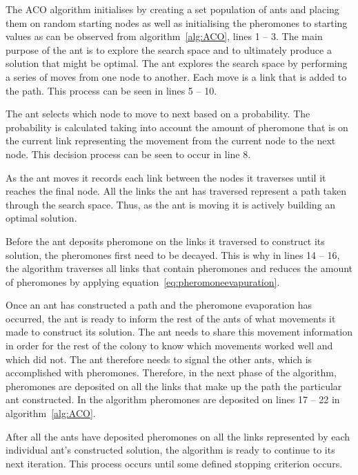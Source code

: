The \gls{ACO} algorithm initialises by creating a set population of ants and placing them on random starting nodes as well as initialising the pheromones to starting values as can be observed from algorithm~\ref{alg:ACO}, lines 1 -- 3. The main purpose of the ant is to explore the search space and to ultimately produce a solution that might be optimal. The ant explores the search space by performing a series of moves from one node to another. Each move is a link that is added to the path. This process can be seen in lines 5 -- 10.

The ant selects which node to move to next based on a probability. The probability is calculated taking into account the amount of pheromone that is on the current link representing the movement from the current node to the next node\cite{CompuIntelligenceIntro,FundamentalSwarm}. This decision process can be seen to occur in line 8.

As the ant moves it records each link between the nodes it traverses until it reaches the final node. All the links the ant has traversed represent a path taken through the search space\cite{CompuIntelligenceIntro,FundamentalSwarm}. Thus, as the ant is moving it is actively building an optimal solution.

Before the ant deposits pheromone on the links it traversed to construct its solution, the pheromones first need to be decayed. This is why in lines 14 -- 16, the algorithm traverses all links that contain pheromones and reduces the amount of pheromones by applying equation~\ref{eq:pheromoneevapuration}.

Once an ant has constructed a path and the pheromone evaporation has occurred, the ant is ready to inform the rest of the ants of what movements it made to construct its solution. The ant needs to share this movement information in order for the rest of the colony to know which movements worked well and which did not. The ant therefore needs to signal the other ants, which is accomplished with pheromones. Therefore, in the next phase of the algorithm, pheromones are deposited on all the links that make up the path the particular ant constructed. In the algorithm pheromones are deposited on lines 17 -- 22 in algorithm~\ref{alg:ACO}.

After all the ants have deposited pheromones on all the links represented by each individual ant's constructed solution, the algorithm is ready to continue to its next iteration. This process occurs until some defined stopping criterion occurs.

